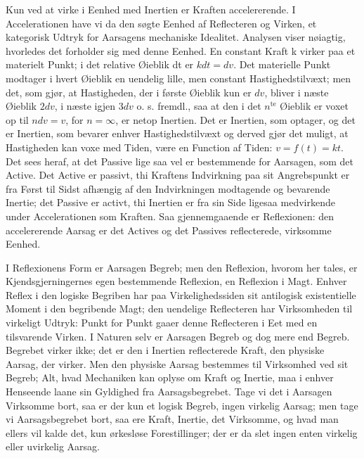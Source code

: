 \documentclass[12pt,a4paper]{book}
\begin{document}
Kun ved at virke i Eenhed med Inertien er Kraften accelererende. I
Accelerationen have vi da den søgte Eenhed af Reflecteren og Virken, et
kategorisk Udtryk for Aarsagens mechaniske Idealitet. Analysen viser
nøiagtig, hvorledes det forholder sig med denne Eenhed. En constant Kraft
k virker paa et materielt Punkt; i det relative Øieblik dt er
$kdt = dv$. Det materielle Punkt modtager i hvert Øieblik en uendelig
lille, men constant Hastighedstilvæxt; men det, som gjør, at Hastigheden,
der i første Øieblik kun er $dv$, bliver i næste Øieblik $2dv$, i næste
igjen $3dv$ o. s. fremdl., saa at den i det $n^{\text{te}}$ Øieblik er
voxet op til $ndv = v$, for $n = \infty$, er netop Inertien. Det er
Inertien, som optager, og det er Inertien, som bevarer enhver
Hastighedstilvæxt og derved gjør det muligt, at Hastigheden kan voxe med
Tiden, være en Function af Tiden: $v = f(t) = kt$. Det sees heraf, at det
Passive lige saa vel er bestemmende for Aarsagen, som det Active. Det
Active er passivt, thi Kraftens Indvirkning paa sit Angrebspunkt er fra
Først til Sidst afhængig af den Indvirkningen modtagende og bevarende
Inertie; det Passive er activt, thi Inertien er fra sin Side ligesaa
medvirkende under Accelerationen som Kraften.
Saa gjennemgaaende er Reflexionen: den accelererende Aarsag er det
Actives og det Passives reflecterede, virksomme Eenhed.

I Reflexionens Form er Aarsagen Begreb; men den Reflexion, hvorom her
tales, er Kjendsgjerningernes egen bestemmende Reflexion, en Reflexion i
Magt. Enhver Reflex i den logiske Begriben har paa Virkelighedssiden sit
antilogisk existentielle Moment i den begribende Magt; den uendelige
Reflecteren har Virksomheden til virkeligt Udtryk: Punkt for Punkt gaaer
denne Reflecteren i Eet med en tilsvarende Virken. I Naturen selv er
Aarsagen Begreb og dog mere end Begreb. Begrebet virker ikke; det er den
i Inertien reflecterede Kraft, den physiske Aarsag, der virker. Men den
physiske Aarsag bestemmes til Virksomhed ved sit Begreb; Alt, hvad
Mechaniken kan oplyse om Kraft og Inertie, maa i enhver Henseende laane
sin Gyldighed fra Aarsagsbegrebet. Tage vi det i Aarsagen Virksomme bort,
saa er der kun et logisk Begreb, ingen virkelig Aarsag; men tage vi
Aarsagsbegrebet bort, saa ere Kraft, Inertie, det Virksomme, og hvad man
ellers vil kalde det, kun ørkesløse Forestillinger; der er da slet ingen
enten virkelig eller uvirkelig Aarsag.
\end{document}
